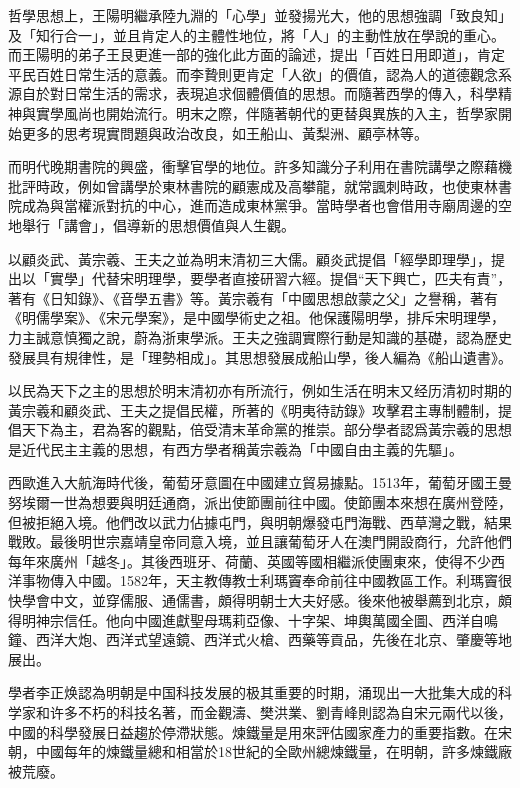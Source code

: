 哲學思想上，王陽明繼承陸九淵的「心學」並發揚光大，他的思想強調「致良知」及「知行合一」，並且肯定人的主體性地位，將「人」的主動性放在學說的重心。而王陽明的弟子王艮更進一部的強化此方面的論述，提出「百姓日用即道」，肯定平民百姓日常生活的意義。而李贄則更肯定「人欲」的價值，認為人的道德觀念系源自於對日常生活的需求，表現追求個體價值的思想。而隨著西學的傳入，科學精神與實學風尚也開始流行。明末之際，伴隨著朝代的更替與異族的入主，哲學家開始更多的思考現實問題與政治改良，如王船山、黃梨洲、顧亭林等。

而明代晚期書院的興盛，衝擊官學的地位。許多知識分子利用在書院講學之際藉機批評時政，例如曾講學於東林書院的顧憲成及高攀龍，就常諷刺時政，也使東林書院成為與當權派對抗的中心，進而造成東林黨爭。當時學者也會借用寺廟周邊的空地舉行「講會」，倡導新的思想價值與人生觀。

以顧炎武、黃宗羲、王夫之並為明末清初三大儒。顧炎武提倡「經學即理學」，提出以「實學」代替宋明理學，要學者直接研習六經。提倡“天下興亡，匹夫有責”，著有《日知錄》、《音學五書》等。黃宗羲有「中國思想啟蒙之父」之譽稱，著有《明儒學案》、《宋元學案》，是中國學術史之祖。他保護陽明學，排斥宋明理學，力主誠意慎獨之說，蔚為浙東學派。王夫之強調實際行動是知識的基礎，認為歷史發展具有規律性，是「理勢相成」。其思想發展成船山學，後人編為《船山遺書》。

以民為天下之主的思想於明末清初亦有所流行，例如生活在明末又经历清初时期的黃宗羲和顧炎武、王夫之提倡民權，所著的《明夷待訪錄》攻擊君主專制體制，提倡天下為主，君為客的觀點，倍受清末革命黨的推崇。部分學者認爲黃宗羲的思想是近代民主主義的思想，有西方學者稱黃宗羲為「中國自由主義的先驅」。

西歐進入大航海時代後，葡萄牙意圖在中國建立貿易據點。1513年，葡萄牙國王曼努埃爾一世為想要與明廷通商，派出使節團前往中國。使節團本來想在廣州登陸，但被拒絕入境。他們改以武力佔據屯門，與明朝爆發屯門海戰、西草灣之戰，結果戰敗。最後明世宗嘉靖皇帝同意入境，並且讓葡萄牙人在澳門開設商行，允許他們每年來廣州「越冬」。其後西班牙、荷蘭、英國等國相繼派使團東來，使得不少西洋事物傳入中國。1582年，天主教傳教士利瑪竇奉命前往中國教區工作。利瑪竇很快學會中文，並穿儒服、通儒書，頗得明朝士大夫好感。後來他被舉薦到北京，頗得明神宗信任。他向中國進獻聖母瑪莉亞像、十字架、坤輿萬國全圖、西洋自鳴鐘、西洋大炮、西洋式望遠鏡、西洋式火槍、西藥等貢品，先後在北京、肇慶等地展出。

學者李正焕認為明朝是中国科技发展的极其重要的时期，涌现出一大批集大成的科学家和许多不朽的科技名著，而金觀濤、樊洪業、劉青峰則認為自宋元兩代以後，中國的科學發展日益趨於停滯狀態。煉鐵量是用來評估國家產力的重要指數。在宋朝，中國每年的煉鐵量總和相當於18世紀的全歐州總煉鐵量，在明朝，許多煉鐵廠被荒廢。

